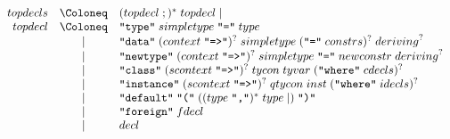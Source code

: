 \begin{align*}
  \begin{array}{rcl}
    {topdecls}
    & \Coloneq & ({topdecl}\; ;)^*\; {topdecl} \mid \\
    {topdecl}
    & \Coloneq & \text{\texttt{\textquotedbl type\textquotedbl}}\; {simpletype}\; \text{\texttt{\textquotedbl =\textquotedbl}}\; {type} \\
    & \mid & \text{\texttt{\textquotedbl data\textquotedbl}}\; ({context}\; \text{\texttt{\textquotedbl =>\textquotedbl}})^?\; {simpletype}\; (\text{\texttt{\textquotedbl =\textquotedbl}}\; {constrs})^?\; {deriving}^? \\
    & \mid & \text{\texttt{\textquotedbl newtype\textquotedbl}}\; ({context}\; \text{\texttt{\textquotedbl =>\textquotedbl}})^?\; {simpletype}\; \text{\texttt{\textquotedbl =\textquotedbl}}\; {newconstr}\; {deriving}^? \\
    & \mid & \text{\texttt{\textquotedbl class\textquotedbl}}\; ({scontext}\; \text{\texttt{\textquotedbl =>\textquotedbl}})^?\; {tycon}\; {tyvar}\; (\text{\texttt{\textquotedbl where\textquotedbl}}\; {cdecls})^? \\
    & \mid & \text{\texttt{\textquotedbl instance\textquotedbl}}\; ({scontext}\; \text{\texttt{\textquotedbl =>\textquotedbl}})^?\; {qtycon}\; {inst}\; (\text{\texttt{\textquotedbl where\textquotedbl}}\; {idecls})^? \\
    & \mid & \text{\texttt{\textquotedbl default\textquotedbl}}\; \text{\texttt{\textquotedbl(\textquotedbl}}\; (({type}\; \text{\texttt{\textquotedbl,\textquotedbl}})^*\; {type} \mid )\; \text{\texttt{\textquotedbl)\textquotedbl}} \\
    & \mid & \text{\texttt{\textquotedbl foreign\textquotedbl}}\; {fdecl} \\
    & \mid & {decl}
  \end{array}
\end{align*}

